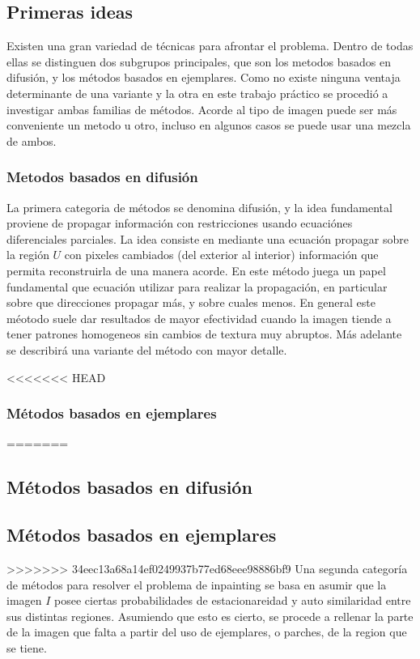 \documentclass[assd_tpf_main.tex]{subfiles}
\begin{document}
\subsection{Primeras ideas}
Existen una gran variedad de técnicas para afrontar el problema. Dentro de todas ellas se distinguen dos subgrupos principales, que son los metodos basados en difusión, y los métodos basados en ejemplares. Como no existe ninguna ventaja determinante de una variante y la otra en este trabajo práctico se procedió a investigar ambas familias de métodos. Acorde al tipo de imagen puede ser más conveniente un metodo u otro, incluso en algunos casos se puede usar una mezcla de ambos.

\subsubsection{Metodos basados en difusión}
La primera categoria de métodos se denomina difusión, y la idea fundamental proviene de propagar información con restricciones usando ecuaciónes diferenciales parciales. La idea consiste en mediante una ecuación propagar sobre la región $U$ con pixeles cambiados (del exterior al interior) información que permita reconstruirla de una manera acorde.
En este método juega un papel fundamental que ecuación utilizar para realizar la propagación, en particular sobre que direcciones propagar más, y sobre cuales menos. En general este méotodo suele dar resultados de mayor efectividad cuando la imagen tiende a tener patrones homogeneos sin cambios de textura muy abruptos.  Más adelante se describirá una variante del método con mayor detalle.

<<<<<<< HEAD
\subsubsection{Métodos basados en ejemplares}
=======
\subsection{Métodos basados en difusión}





\subsection{Métodos basados en ejemplares}
>>>>>>> 34eec13a68a14ef0249937b77ed68eee98886bf9
Una segunda categor\'ia de m\'etodos para resolver el problema de inpainting se basa en 
asumir que la imagen $I$ posee ciertas probabilidades de estacionareidad y auto similaridad 
entre sus distintas regiones. Asumiendo que esto es cierto, se procede a rellenar la parte
de la imagen que falta a partir del uso de ejemplares, o parches, de la region que se tiene.
\end{document}
